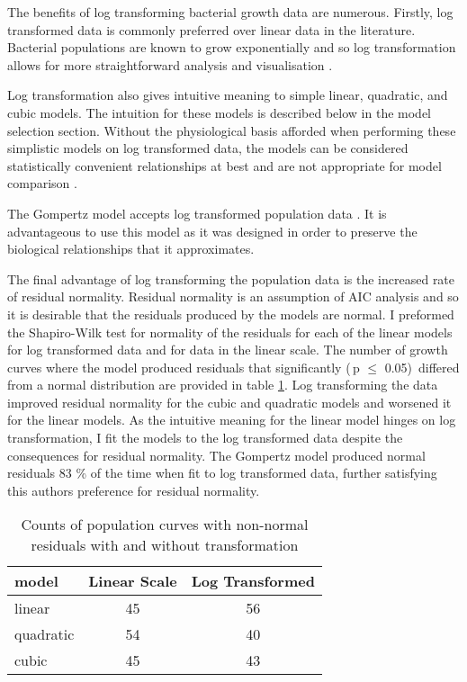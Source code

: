 \documentclass[11pt]{article}
\begin{document}
  The benefits of log transforming bacterial growth data are numerous. Firstly, log transformed data is commonly preferred over linear data in the literature. Bacterial populations are known to grow exponentially and so log transformation allows for more straightforward analysis and visualisation \citep{Madigan_Michael2021-07-01}. 

  Log transformation also gives intuitive meaning to simple linear, quadratic, and cubic models. The intuition for these models is described below in the model selection section. Without the physiological basis afforded when performing these simplistic models on log transformed data, the models can be considered statistically convenient relationships at best and are not appropriate for model comparison \citep{Baranyi1995}. 

  The Gompertz model accepts log transformed population data \citep{Peleg2011}. It is advantageous to use this model as it was designed in order to preserve the biological relationships that it approximates. 

  The final advantage of log transforming the population data is the increased rate of residual normality. Residual normality is an assumption of AIC analysis \citep{Johnson2004} and so it is desirable that the residuals produced by the models are normal. I preformed the Shapiro-Wilk test for normality of the residuals for each of the linear models for log transformed data and for data in the linear scale. The number of growth curves where the model produced residuals that significantly (\,p $\le$ 0.05)\, differed from a normal distribution are provided in table \ref{tbl1}. Log transforming the data improved residual normality for the cubic and quadratic models and worsened it for the linear models.  As the intuitive meaning for the linear model hinges on log transformation, I fit the models to the log transformed data despite the consequences for residual normality. The Gompertz model produced normal residuals 83 \% of the time when fit to log transformed data, further satisfying this authors preference for residual normality. 

   \begin{table}[!ht]
    \centering
    \begin{tabular}{lcc}
    \hline
        \textbf{model} & \textbf{Linear Scale} & \textbf{Log Transformed} \\ \hline
        linear & 45 & 56 \\ 
        quadratic & 54 & 40 \\ 
        cubic & 45 & 43 \\ \hline
    \end{tabular}
    \caption{Counts of population curves with non-normal residuals with and without transformation}
    \label{tbl1}
    \end{table}
\end{document}
